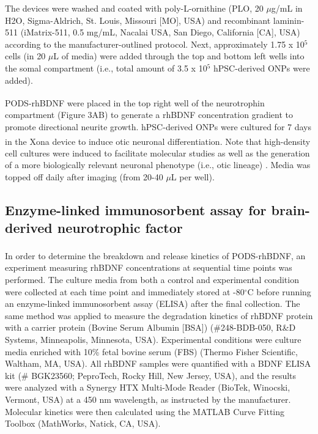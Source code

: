 \documentclass[review]{elsarticle}
\begin{document}
The devices were washed and coated with poly-L-ornithine (PLO, 20 $\mu$g/mL in H\lowercase{2}O, Sigma-Aldrich, St. Louis, Missouri [MO], USA) and recombinant laminin-511 (iMatrix-511, 0.5 mg/mL, Nacalai USA, San Diego, California [CA], USA) according to the manufacturer-outlined protocol. Next, approximately 1.75  x 10$^{5}$ cells (in 20 $\mu$L of media) were added through the top and bottom left wells into the somal compartment (i.e., total amount of 3.5 x 10$^{5}$ hPSC-derived ONPs were added). 

\indent PODS\textsuperscript{\textregistered}-rhBDNF were placed in the top right well of the neurotrophin compartment (Figure 3A\textendash B) to generate a rhBDNF concentration gradient to promote directional neurite growth.  hPSC-derived ONPs were cultured for 7 days in the Xona\textsuperscript{\texttrademark} device to induce otic neuronal differentiation. Note that high-density cell cultures were induced to facilitate molecular studies as well as the generation of a more biologically relevant neuronal phenotype (i.e., otic lineage) \cite{Al-Ali2017a}. Media was topped off daily after imaging (from 20-40 $\mu$L per well).

\subsection{Enzyme-linked immunosorbent assay for brain-derived neurotrophic factor}
In order to determine the breakdown and release kinetics of PODS\textsuperscript{\textregistered}-rhBDNF, an experiment measuring rhBDNF concentrations at sequential time points was performed. The culture media from both a control and experimental condition were collected at each time point and immediately stored at -80$^\circ$C before running an enzyme-linked immunosorbent assay (ELISA) after the final collection. The same method was applied to measure the degradation kinetics of rhBDNF protein with a carrier protein (Bovine Serum Albumin [BSA]) (\#248-BDB-050, R\&D Systems, Minneapolis, Minnesota, USA). Experimental conditions were culture media enriched with 10\% fetal bovine serum (FBS) (Thermo Fisher Scientific, Waltham, MA, USA). All rhBDNF samples were quantified with a BDNF ELISA kit (\# BGK23560; PeproTech, Rocky Hill, New Jersey, USA), and the results were analyzed with a Synergy HTX Multi-Mode Reader (BioTek, Winocski, Vermont, USA) at a 450 nm wavelength, as instructed by the manufacturer. Molecular kinetics were then calculated using the MATLAB Curve Fitting Toolbox (MathWorks, Natick, CA, USA).
\end{document}
